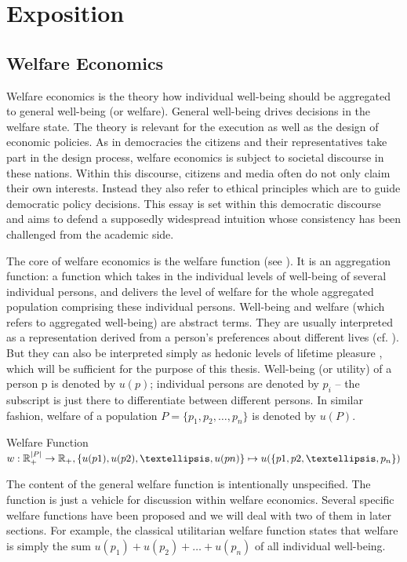 \chapter{Exposition}
\section{Welfare Economics}

Welfare economics is the theory how individual well-being should be aggregated to general well-being (or welfare). General well-being drives decisions in the welfare state. The theory is relevant for the execution as well as the design of economic policies. As in democracies the citizens and their representatives take part in the design process, welfare economics is subject to societal discourse in these nations. Within this discourse, citizens and media often do not only claim their own interests. Instead they also refer to ethical principles which are to guide democratic policy decisions. This essay is set within this democratic discourse and aims to defend a supposedly widespread intuition whose consistency has been challenged from the academic side.  

The core of welfare economics is the welfare function (see ). It is an aggregation function: a function which takes in the individual levels of well-being of several individual persons, and delivers the level of welfare for the whole aggregated population comprising these individual persons. Well-being and welfare (which refers to aggregated well-being) are abstract terms. They are usually interpreted as a representation derived from a person's preferences about different lives (cf. ). But they can also be interpreted simply as hedonic levels of lifetime pleasure , which will be sufficient for the purpose of this thesis. Well-being (or utility) of a person p is denoted by $u(p)$; individual persons are denoted by $p_i$ – the subscript is just there to differentiate between different persons. In similar fashion, welfare of a population $P = \{ p_1, p_2, …, p_n \}$ is denoted by $u(P)$. 

\begin{Definition}{Welfare Function}{}
$
  w: \hfill
  \mathbb{R}_+^{|P|} \rightarrow \mathbb{R}_+, \hfill
  \{ u(p1), u(p2), …, u(pn) \} \mapsto u( \{ p1, p2, …, p_n \} ) 
$
\end{Definition}

The content of the general welfare function is intentionally unspecified. The function is just a vehicle for discussion within welfare economics. Several specific welfare functions have been proposed and we will deal with two of them in later sections. For example, the classical utilitarian welfare function states that welfare is simply the sum $u(p_1) + u(p_2) + … + u(p_n)$ of all individual well-being.  


